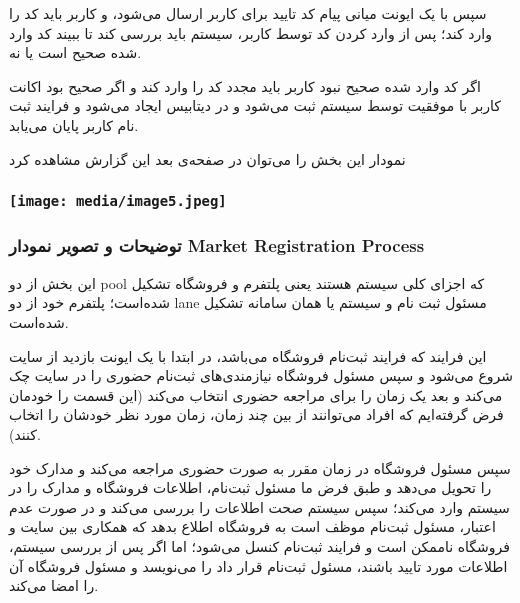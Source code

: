 \documentclass[]{article}
\begin{document}
سپس با یک ایونت میانی پیام کد تایید برای کاربر ارسال می‌شود، و کاربر
باید کد را وارد کند؛ پس از وارد کردن کد توسط کاربر، سیستم باید بررسی کند
تا ببیند کد وارد شده صحیح است یا نه.

اگر کد وارد شده صحیح نبود کاربر باید مجدد کد را وارد کند و اگر صحیح بود
اکانت کاربر با موفقیت توسط سیستم ثبت می‌شود و در دیتابیس ایجاد می‌شود و
فرایند ثبت نام کاربر پایان می‌یابد.

نمودار این بخش را می‌توان در صفحه‌ی بعد این گزارش مشاهده کرد

\subsubsection{}\label{section-2}

\subsubsection{\texorpdfstring{\protect\hypertarget{_Toc62248362}{}{\protect\hypertarget{_Toc62248872}{}{}}\protect\texttt{[image: media/image5.jpeg]}}{}}\label{section-3}

\subsubsection{توضیحات و تصویر نمودار Market Registration
Process}\label{ux62aux648ux636ux6ccux62dux627ux62a-ux648-ux62aux635ux648ux6ccux631-ux646ux645ux648ux62fux627ux631-market-registration-process}

این بخش از دو pool که اجزای کلی سیستم هستند یعنی پلتفرم و فروشگاه تشکیل
شده‌است؛ پلتفرم خود از دو lane مسئول ثبت نام و سیستم یا همان سامانه
تشکیل شده‌است.

این فرایند که فرایند ثبت‌نام فروشگاه می‌باشد، در ابتدا با یک ایونت
بازدید از سایت شروع می‌شود و سپس مسئول فروشگاه نیازمندی‌های ثبت‌نام
حضوری را در سایت چک می‌کند و بعد یک زمان را برای مراجعه حضوری انتخاب
می‌کند (این قسمت را خودمان فرض گرفته‌ایم که افراد می‌توانند از بین چند
زمان، زمان مورد نظر خودشان را اتخاب کنند).

سپس مسئول فروشگاه در زمان مقرر به صورت حضوری مراجعه می‌کند و مدارک خود
را تحویل می‌دهد و طبق فرض ما مسئول ثبت‌نام، اطلاعات فروشگاه و مدارک را
در سیستم وارد می‌کند؛ سپس سیستم صحت اطلاعات را بررسی می‌کند و در صورت
عدم اعتبار، مسئول ثبت‌نام موظف است به فروشگاه اطلاع بدهد که همکاری بین
سایت و فروشگاه ناممکن است و فرایند ثبت‌نام کنسل می‌شود؛ اما اگر پس از
بررسی سیستم، اطلاعات مورد تایید باشند، مسئول ثبت‌نام قرار داد را
می‌نویسد و مسئول فروشگاه آن را امضا می‌کند.
\end{document}
